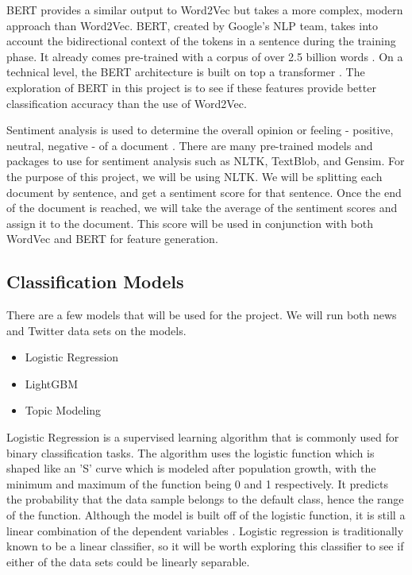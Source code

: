 \documentclass[conference]{IEEEtran}
\begin{document}
BERT provides a similar output to Word2Vec but takes a more complex, modern approach than Word2Vec. BERT, created by Google's NLP team, takes into account the bidirectional context of the tokens in a sentence during the training phase. It already comes pre-trained with a corpus of over 2.5 billion words \cite{b13}. On a technical level, the BERT architecture is built on top a transformer \cite{b11}. The exploration of BERT in this project is to see if these features provide better classification accuracy than the use of Word2Vec.

Sentiment analysis is used to determine the overall opinion or feeling - positive, neutral, negative - of a document \cite{b8}. There are many pre-trained models and packages to use for sentiment analysis such as NLTK, TextBlob, and Gensim. For the purpose of this project, we will be using NLTK. We will be splitting each document by sentence, and get a sentiment score for that sentence. Once the end of the document is reached, we will take the average of the sentiment scores and assign it to the document. This score will be used in conjunction with both WordVec and BERT for feature generation.

\subsection{Classification Models}
There are a few models that will be used for the project. We will run both news and Twitter data sets on the models.
\begin{itemize}
    \item Logistic Regression
    \item LightGBM
    \item Topic Modeling
\end{itemize}

Logistic Regression is a supervised learning algorithm that is commonly used for binary classification tasks. The algorithm uses the logistic function which is shaped like an 'S' curve which is modeled after population growth, with the minimum and maximum of the function being 0 and 1 respectively. It predicts the probability that the data sample belongs to the default class, hence the range of the function. Although the model is built off of the logistic function, it is still a linear combination of the dependent variables \cite{b7}. Logistic regression is traditionally known to be a linear classifier, so it will be worth exploring this classifier to see if either of the data sets could be linearly separable.
\end{document}
